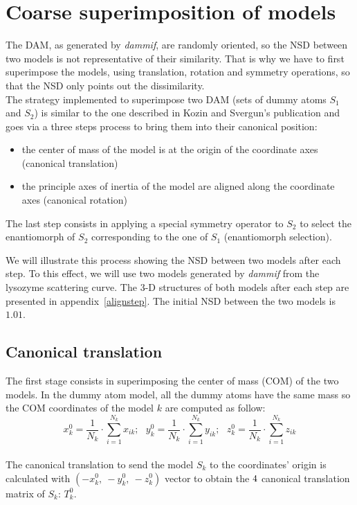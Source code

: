 \documentclass[a4paper, 11pt]{report}
\begin{document}
\section{Coarse superimposition of models}

The DAM, as generated by \textit{dammif}, are randomly oriented, so the NSD
between two models is not representative of their similarity.
That is why we have to first superimpose the models, using 
translation, rotation and symmetry operations, so that the NSD only 
points out the dissimilarity.\\

The strategy implemented to superimpose two DAM (sets of
dummy atoms $S_{1}$ and $S_{2}$) is similar to the one described in 
Kozin and Svergun's publication \cite{supcomb} and goes via a three 
steps process to bring them into their canonical position:
\begin{itemize}
  \item the center of mass of the model is at the origin of the 
        coordinate axes (canonical translation)
  \item the principle axes of inertia of the model are aligned along 
        the coordinate axes (canonical rotation)
\end{itemize}
The last step consists in applying a special symmetry operator to 
$S_{2}$ to select the enantiomorph of $S_{2}$ corresponding to the one 
of $S_{1}$ (enantiomorph selection).

We will illustrate this process showing the NSD between two models 
after each step. 
To this effect, we will use two models generated by \textit{dammif} 
from the lysozyme scattering curve. 
The 3-D structures of both models after each step are presented in 
appendix~\ref{alignstep}.
The initial NSD between the two models is $1.01$.

\subsection{Canonical translation}

The first stage consists in superimposing the center of mass (COM) of 
the two models. 
In the dummy atom model, all the dummy atoms have the same mass so the 
COM coordinates of the model $k$ are computed as follow:
\[
x_{k}^0 = \frac{1}{N_{k}} \cdot \sum\limits_{i=1}^{N_{k}} x_{ik};\ \ \ 
y_{k}^0 = \frac{1}{N_{k}} \cdot \sum\limits_{i=1}^{N_{k}} y_{ik};\ \ \ 
z_{k}^0 = \frac{1}{N_{k}} \cdot \sum\limits_{i=1}^{N_{k}} z_{ik}
\]\\
The canonical translation to send the model $S_{k}$ to the coordinates' 
origin is calculated with $(-x_{k}^0,\ -y_{k}^0,\ -z_{k}^0)$ vector to 
obtain the $4 \time 4$ canonical translation matrix of $S_{k}$: 
$T_{k}^0$.
\end{document}
